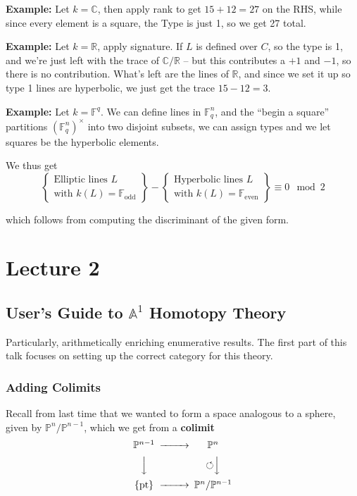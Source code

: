 \documentclass[11pt]{scrreprt}
\theoremstyle{definition}
\newcommand{\RR}[0]{{\mathbb{R}}}
\newcommand{\CC}[0]{{\mathbb{C}}}
\newcommand{\FF}[0]{{\mathbb{F}}}
\newcommand{\PP}[0]{{\mathbb{P}}}
\newcommand{\Af}[0]{{\mathbb{A}}}
\newcommand{\mltext}[1]{\left\{\begin{array}{c}#1\end{array}\right\}}
\newcommand{\pt}[0]{\{\text{pt}\}}
\newcommand{\selfmap}[0]{{\circlearrowleft}}
\begin{document}
\textbf{Example:} Let \(k=\CC\), then apply rank to get \(15+12=27\) on
the RHS, while since every element is a square, the Type is just 1, so
we get 27 total.

\textbf{Example:} Let \(k=\RR\), apply signature. If \(L\) is defined
over \(C\), so the type is 1, and we're just left with the trace of
\(\CC/\RR\) -- but this contributes a \(+1\) and \(-1\), so there is no
contribution. What's left are the lines of \(\RR\), and since we set it
up so type 1 lines are hyperbolic, we just get the trace \(15-12=3\).

\textbf{Example:} Let \(k=\FF^q\). We can define lines in \(\FF_q^n\),
and the ``begin a square'' partitions \((\FF_q^n)^\times\) into two
disjoint subsets, we can assign types and we let squares be the
hyperbolic elements.

We thus get \[
\mltext{
    \text{Elliptic lines $L$ } \\
    \text{with $k(L) = \FF_\text{odd}$}
} -
\mltext{
    \text{Hyperbolic lines $L$} \\
    \text{with $k(L) = \FF_\text{even}$}
}
\equiv 0 \mod 2
\]

which follows from computing the discriminant of the given form.

\hypertarget{lecture-2}{%
\chapter{Lecture 2}\label{lecture-2}}

\hypertarget{users-guide-to-af1-homotopy-theory}{%
\section{\texorpdfstring{User's Guide to \(\Af^1\) Homotopy
Theory}{User's Guide to \textbackslash{}Af\^{}1 Homotopy Theory}}\label{users-guide-to-af1-homotopy-theory}}

Particularly, arithmetically enriching enumerative results. The first
part of this talk focuses on setting up the correct category for this
theory.

\hypertarget{adding-colimits}{%
\subsection{Adding Colimits}\label{adding-colimits}}

Recall from last time that we wanted to form a space analogous to a
sphere, given by \(\PP^n/ \PP^{n-1}\), which we get from a
\textbf{colimit} \[
\begin{CD}
  \PP^{n-1} @>>> \PP^n \\
  @VVV \selfmap @VVV \\
  \pt @>>> \PP^n/ \PP^{n-1}
\end{CD}
\]
\end{document}
